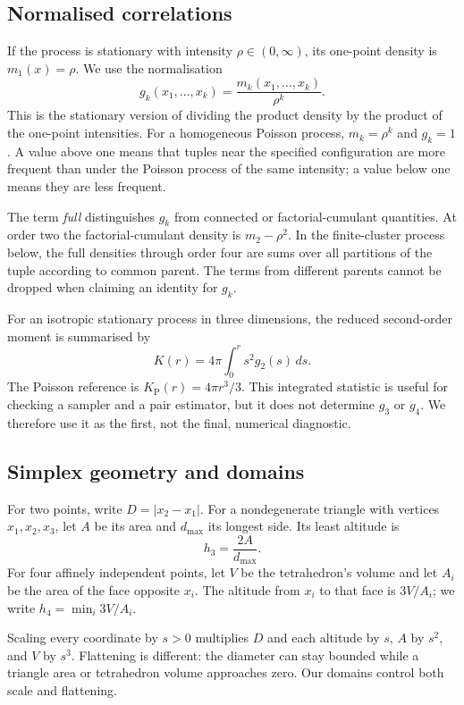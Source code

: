 \subsection{Normalised correlations}

If the process is stationary with intensity $\rho\in(0,\infty)$, its one-point density is $m_1(x)=\rho$. We use the normalisation
\[
 g_k(x_1,\ldots,x_k)=\frac{m_k(x_1,\ldots,x_k)}{\rho^k}.
\]
This is the stationary version of dividing the product density by the product of the one-point intensities. For a homogeneous Poisson process, $m_k=\rho^k$ and $g_k=1$. A value above one means that tuples near the specified configuration are more frequent than under the Poisson process of the same intensity; a value below one means they are less frequent.

The term \emph{full} distinguishes $g_k$ from connected or factorial-cumulant quantities. At order two the factorial-cumulant density is $m_2-\rho^2$. In the finite-cluster process below, the full densities through order four are sums over all partitions of the tuple according to common parent. The terms from different parents cannot be dropped when claiming an identity for $g_k$.

For an isotropic stationary process in three dimensions, the reduced second-order moment is summarised by
\begin{equation}
 K(r)=4\pi\int_0^r s^2g_2(s)\,ds.
 \label{eq:K-definition}
\end{equation}
The Poisson reference is $K_{\mathrm P}(r)=4\pi r^3/3$. This integrated statistic is useful for checking a sampler and a pair estimator, but it does not determine $g_3$ or $g_4$. We therefore use it as the first, not the final, numerical diagnostic.

\subsection{Simplex geometry and domains}

For two points, write $D=|x_2-x_1|$. For a nondegenerate triangle with vertices $x_1,x_2,x_3$, let $A$ be its area and $d_{\max}$ its longest side. Its least altitude is
\[
 h_3=\frac{2A}{d_{\max}}.
\]
For four affinely independent points, let $V$ be the tetrahedron's volume and let $A_i$ be the area of the face opposite $x_i$. The altitude from $x_i$ to that face is $3V/A_i$; we write $h_4=\min_i3V/A_i$.

Scaling every coordinate by $s>0$ multiplies $D$ and each altitude by $s$, $A$ by $s^2$, and $V$ by $s^3$. Flattening is different: the diameter can stay bounded while a triangle area or tetrahedron volume approaches zero. Our domains control both scale and flattening.
